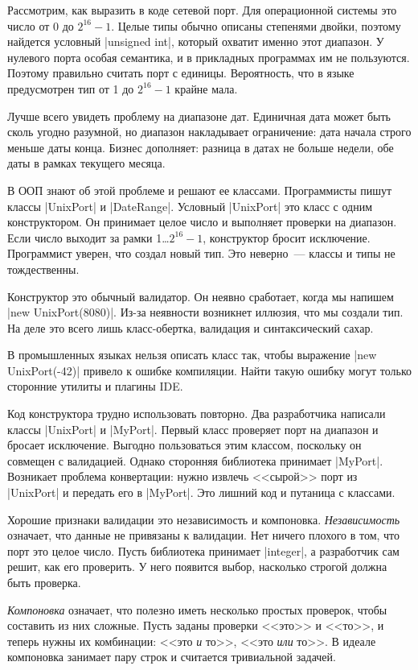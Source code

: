 Рассмотрим, как выразить в коде сетевой порт. Для операционной системы это число
от 0 до $2^{16}-1$. Целые типы обычно описаны степенями двойки, поэтому найдется
условный \spverb|unsigned int|, который охватит именно этот диапазон. У нулевого
порта особая семантика, и в прикладных программах им не пользуются. Поэтому
правильно считать порт с единицы. Вероятность, что в языке предусмотрен тип от 1
до $2^{16}-1$ крайне мала.

Лучше всего увидеть проблему на диапазоне дат. Единичная дата может быть сколь
угодно разумной, но диапазон накладывает ограничение: дата начала строго меньше
даты конца. Бизнес дополняет: разница в датах не больше недели, обе даты в
рамках текущего месяца.

В ООП знают об этой проблеме и решают ее классами. Программисты пишут классы
\spverb|UnixPort| и \spverb|DateRange|. Условный \spverb|UnixPort| это класс с
одним конструктором. Он принимает целое число и выполняет проверки на
диапазон. Если число выходит за рамки 1\dots$2^{16}-1$, конструктор бросит
исключение. Программист уверен, что создал новый тип. Это неверно~--- классы и
типы не тождественны.

Конструктор это обычный валидатор. Он неявно сработает, когда мы напишем
\spverb|new UnixPort(8080)|. Из-за неявности возникнет иллюзия, что мы создали
тип. На деле это всего лишь класс-обертка, валидация и синтаксический сахар.

В промышленных языках нельзя описать класс так, чтобы выражение \spverb|new UnixPort(-42)|
привело к ошибке компиляции. Найти такую ошибку могут только сторонние утилиты
и плагины IDE.

Код конструктора трудно использовать повторно. Два разработчика написали классы
\spverb|UnixPort| и \spverb|MyPort|. Первый класс проверяет порт на диапазон и
бросает исключение. Выгодно пользоваться этим классом, поскольку он совмещен с
валидацией. Однако сторонняя библиотека принимает \spverb|MyPort|. Возникает
проблема конвертации: нужно извлечь <<сырой>> порт из \spverb|UnixPort| и
передать его в \spverb|MyPort|. Это лишний код и путаница с классами.

Хорошие признаки валидации это независимость и компоновка. \emph{Независимость}
означает, что данные не привязаны к валидации. Нет ничего плохого в том, что
порт это целое число. Пусть библиотека принимает \spverb|integer|, а разработчик
сам решит, как его проверить. У него появится выбор, насколько строгой должна
быть проверка.

\emph{Компоновка} означает, что полезно иметь несколько простых проверок, чтобы
составить из них сложные. Пусть заданы проверки <<это>> и <<то>>, и теперь нужны
их комбинации: <<это \emph{и} то>>, <<это \emph{или} то>>. В идеале компоновка
занимает пару строк и считается тривиальной задачей.


